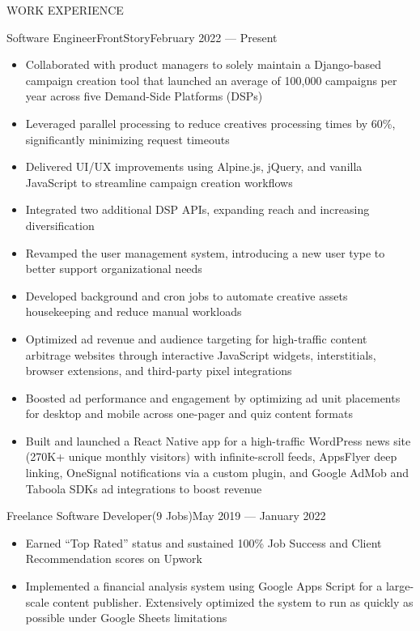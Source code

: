 \documentclass[]{mcdowellcv}
\begin{document}
	\makeheader
	
	
	\begin{cvsection}{WORK EXPERIENCE}
		\begin{cvsubsection}{Software Engineer}{FrontStory}{February 2022 — Present}
			\begin{itemize}
				\item Collaborated with product managers to solely maintain a Django-based campaign creation tool that launched an average of 100,000 campaigns per year across five Demand-Side Platforms (DSPs)
				\item Leveraged parallel processing to reduce creatives processing times by 60\%, significantly minimizing request timeouts
				\item Delivered UI/UX improvements using Alpine.js, jQuery, and vanilla JavaScript to streamline campaign creation workflows
				\item Integrated two additional DSP APIs, expanding reach and increasing diversification
				\item Revamped the user management system, introducing a new user type to better support organizational needs
				\item Developed background and cron jobs to automate creative assets housekeeping and reduce manual workloads
				\item Optimized ad revenue and audience targeting for high-traffic content arbitrage websites through interactive JavaScript widgets, interstitials, browser extensions, and third-party pixel integrations
				\item Boosted ad performance and engagement by optimizing ad unit placements for desktop and mobile across one-pager and quiz content formats
				\item Built and launched a React Native app for a high-traffic WordPress news site (270K+ unique monthly visitors) with infinite-scroll feeds, AppsFlyer deep linking, OneSignal notifications via a custom plugin, and Google AdMob and Taboola SDKs ad integrations to boost revenue
			\end{itemize}
		\end{cvsubsection}
		\begin{cvsubsection}{Freelance Software Developer}{(9 Jobs)}{May 2019 — January 2022}
			\begin{itemize}
				\item Earned “Top Rated” status and sustained 100\% Job Success and Client Recommendation scores on Upwork
				\item Implemented a financial analysis system using Google Apps Script for a large-scale content publisher. Extensively optimized the system to run as quickly as possible under Google Sheets limitations
			\end{itemize}
		\end{cvsubsection}
	\end{cvsection}
	
\end{document}
